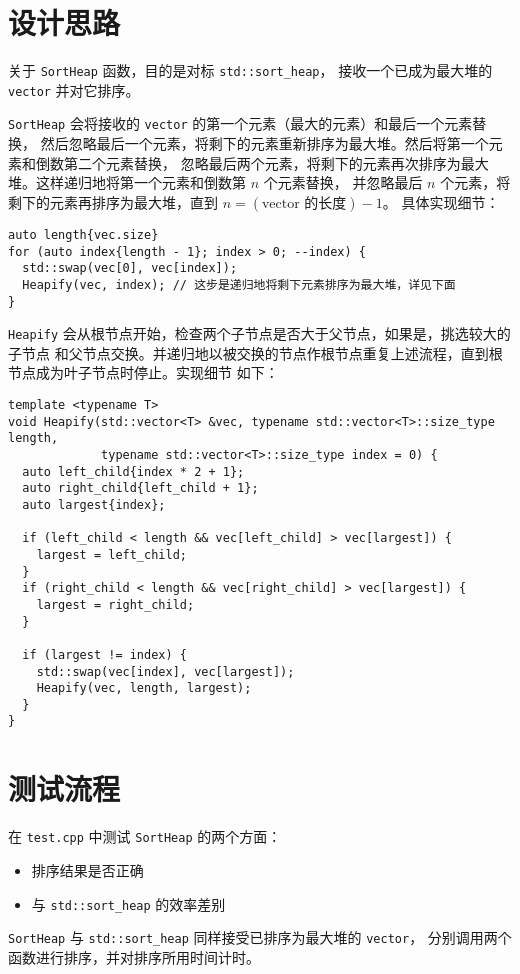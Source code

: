 \documentclass[UTF8, 12pt]{ctexart}
\begin{document}
\section{设计思路}
关于 \verb|SortHeap| 函数，目的是对标 \verb|std::sort_heap|，
接收一个已成为最大堆的 \verb|vector| 并对它排序。

\verb|SortHeap| 会将接收的 \verb|vector| 的第一个元素（最大的元素）和最后一个元素替换，
然后忽略最后一个元素，将剩下的元素重新排序为最大堆。然后将第一个元素和倒数第二个元素替换，
忽略最后两个元素，将剩下的元素再次排序为最大堆。这样递归地将第一个元素和倒数第 $n$ 个元素替换，
并忽略最后 $n$ 个元素，将剩下的元素再排序为最大堆，直到 $n = (\text{vector 的长度}) - 1$。
具体实现细节：
\begin{verbatim}
auto length{vec.size}
for (auto index{length - 1}; index > 0; --index) {
  std::swap(vec[0], vec[index]);
  Heapify(vec, index); // 这步是递归地将剩下元素排序为最大堆，详见下面
}
\end{verbatim}
\verb|Heapify| 会从根节点开始，检查两个子节点是否大于父节点，如果是，挑选较大的子节点
和父节点交换。并递归地以被交换的节点作根节点重复上述流程，直到根节点成为叶子节点时停止。实现细节
如下：
\begin{verbatim}
template <typename T>
void Heapify(std::vector<T> &vec, typename std::vector<T>::size_type length,
             typename std::vector<T>::size_type index = 0) {
  auto left_child{index * 2 + 1};
  auto right_child{left_child + 1};
  auto largest{index};

  if (left_child < length && vec[left_child] > vec[largest]) {
    largest = left_child;
  }
  if (right_child < length && vec[right_child] > vec[largest]) {
    largest = right_child;
  }

  if (largest != index) {
    std::swap(vec[index], vec[largest]);
    Heapify(vec, length, largest);
  }
}
\end{verbatim}
\section{测试流程}
在 \verb|test.cpp| 中测试 \verb|SortHeap| 的两个方面：
\begin{itemize}
  \item 排序结果是否正确
  \item 与 \verb|std::sort_heap| 的效率差别
\end{itemize}
\verb|SortHeap| 与 \verb|std::sort_heap| 同样接受已排序为最大堆的 \verb|vector|，
分别调用两个函数进行排序，并对排序所用时间计时。
\end{document}
